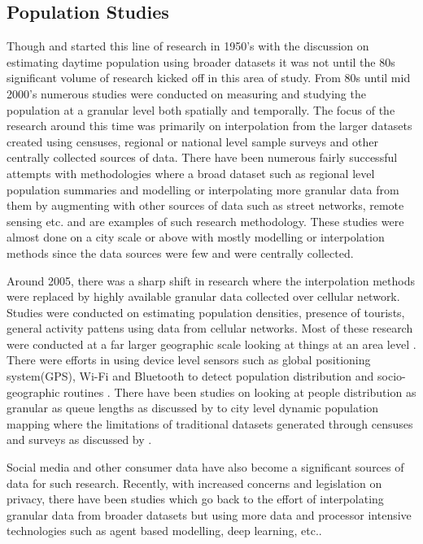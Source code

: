 \subsection{Population Studies}
Though \citet{foley1954} and \citet{schmitt1956} started this line of research in 1950's with the discussion on estimating daytime population using broader datasets it was not until the 80s significant volume of research kicked off in this area of study.
From 80s until mid 2000's numerous studies were conducted on measuring and studying the population at a granular level both spatially and temporally.
The focus of the research around this time was primarily on interpolation from the larger datasets created using censuses, regional or national level sample surveys and other centrally collected sources of data.
There have been numerous fairly successful attempts with methodologies where a broad dataset such  as regional level population summaries and modelling or interpolating more granular data from them by augmenting with other sources of data such as street networks\cite[-3.5cm]{reibel2005}, remote sensing\cite[-7cm]{sutton1997} \cite{chen2002} etc.
\citet{dobson2000, dobson2003a, bhaduri2002, bhaduri2007} and \citep{mennis2003, mennis2006} are examples of such research methodology.
These studies were almost done on a city scale or above with mostly modelling or interpolation methods since the data sources were few and were centrally collected.

Around 2005, there was a sharp shift in research where the interpolation methods were replaced by highly available granular data collected over cellular network.
Studies were conducted on estimating population densities, presence of tourists, general activity pattens using data from cellular networks.
Most of these research were conducted at a far larger geographic scale looking at things at an area level \citep{pulselli2008,girardin2009,phithakkitnukoon2010,yuan2016}.
There were efforts in using device level sensors such as global positioning system(GPS), Wi-Fi and Bluetooth to detect population distribution and socio-geographic routines \citep{calabrese2010,rose2010,farrahi2010}.
There have been studies on looking at people distribution as granular as queue lengths as discussed by \citet{wang2013} to city level dynamic population mapping where the limitations of traditional datasets generated through censuses and surveys as discussed by \citet{deville2014}.

Social media and other consumer data have also become a significant sources of data for such research.
Recently, with increased concerns and legislation on privacy, there have been studies which go back to the effort of interpolating granular data from broader datasets but using more data and processor intensive technologies such as agent based modelling\cite[-2.5cm]{crols2019}, deep learning, etc.\cite{shibata2019}.


